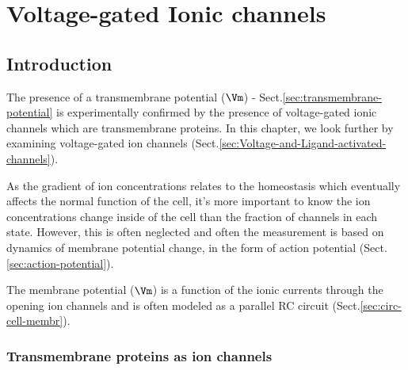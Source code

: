 
\chapter[Voltage-gated Ionic Channels]{Voltage-gated Ionic channels}
\label{chap:voltage-gated-ionic}


\def\spot{{\text{spot}}}
\def\Erev{{\text{E}_{\text{rev}}}}
\def\peak{{\text{peak}}}
\def\step{{\text{step}}}
\def\inj{{\text{inj}}}
\def\spot{{\text{splot}}}
\def\leak{{\text{leak}}}
\def\loss{{\text{loss}}}
\def\out{{\text{out}}}
\def\ion{{\text{ion}}}
\def\axial{{\text{axial}}}
\def\Vcond{{\text{Vcond}}}
\def\Vstep{{\text{Vstep}}}


\section{Introduction}
\label{sec:introduction}

The presence of a transmembrane potential ($\Vm$) -
Sect.\ref{sec:transmembrane-potential} is experimentally confirmed by the
presence of voltage-gated ionic channels which are transmembrane proteins.
In this chapter, we look further by examining voltage-gated ion channels
(Sect.\ref{sec:Voltage-and-Ligand-activated-channels}).

As the gradient of ion concentrations relates to the homeostasis which
eventually affects the normal function of the cell, it's more important to know
the ion concentrations change inside of the cell than the fraction of channels
in each state. However, this is often neglected and often the measurement is
based on dynamics of membrane potential change, in the form of action potential
(Sect.\ref{sec:action-potential}).

The membrane potential ($\Vm$) is a function of the ionic currents through the
opening ion channels and is often modeled as a parallel RC circuit
(Sect.\ref{sec:circ-cell-membr}).

\subsection{Transmembrane proteins as ion channels}
\label{sec:intro-channel-and-membrane}
\label{sec:ion-channel}

